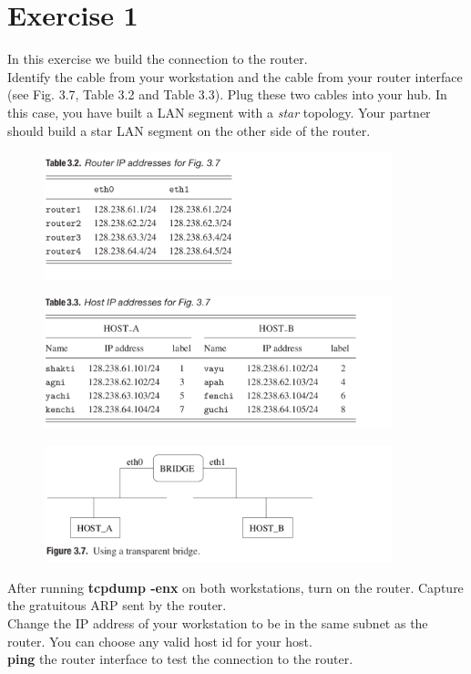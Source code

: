 \documentclass[10pt,a4paper]{article}
\numberwithin{equation}{section}
\numberwithin{figure}{section}
\numberwithin{table}{section}
\begin{document}
    \section{ Exercise 1}
    In this exercise we build the connection to the router. \\
    Identify the cable from your workstation and the cable from your router interface (see Fig. 3.7, Table 3.2 and Table 3.3).
    Plug these two cables into your hub.
    In this case, you have built a LAN segment with a \textit{star} topology.
    Your partner should build a star LAN segment on the other side of the router. \\
    \begin{figure}[H]
        \centering
        \includegraphics[width=0.9\textwidth]{img/table3-2.png}
    \end{figure}
    \begin{figure}[H]
        \centering
        \includegraphics[width=0.9\textwidth]{img/table3-3.png}
    \end{figure}
    \begin{figure}[H]
        \centering
        \includegraphics[width=0.9\textwidth]{img/figure3-7.png}
    \end{figure}
    After running \textbf{tcpdump -enx} on both workstations, turn on the router. Capture the
    gratuitous ARP sent by the router. \\
    Change the IP address of your workstation to be in the same subnet as the router.
    You can choose any valid host id for your host. \\
    \textbf{ping} the router interface to test the connection to the router.
\end{document}
